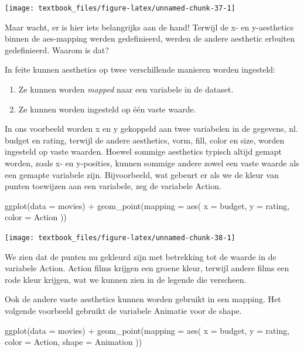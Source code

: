 \documentclass[]{tufte-book}
\newenvironment{Shaded}{}{}
\newcommand{\AttributeTok}[1]{\textcolor[rgb]{0.49,0.56,0.16}{#1}}
\newcommand{\FunctionTok}[1]{\textcolor[rgb]{0.02,0.16,0.49}{#1}}
\newcommand{\NormalTok}[1]{#1}
\newcommand{\SpecialCharTok}[1]{\textcolor[rgb]{0.25,0.44,0.63}{#1}}
\providecommand{\tightlist}{%
  \setlength{\itemsep}{0pt}\setlength{\parskip}{0pt}}
\begin{document}
\texttt{[image: textbook\_files/figure-latex/unnamed-chunk-37-1]}

Maar wacht, er is hier iets belangrijks aan de hand! Terwijl de x- en y-aesthetics binnen de aes-mapping werden gedefinieerd, werden de andere aesthetic erbuiten gedefinieerd. Waarom is dat?

In feite kunnen aesthetics op twee verschillende manieren worden ingesteld:

\begin{enumerate}
\def\labelenumi{\arabic{enumi}.}
\tightlist
\item
  Ze kunnen worden \emph{mapped} naar een variabele in de dataset.
\item
  Ze kunnen worden ingesteld op één vaste waarde.
\end{enumerate}

In ons voorbeeld worden x en y gekoppeld aan twee variabelen in de gegevens, nl. budget en rating, terwijl de andere aesthetics, vorm, fill, color en size, worden ingesteld op vaste waarden. Hoewel sommige aesthetics typisch altijd gemapt worden, zoals x- en y-posities, kunnen sommige andere zowel een vaste waarde als een gemapte variabele zijn. Bijvoorbeeld, wat gebeurt er als we de kleur van punten toewijzen aan een variabele, zeg de variabele Action.

\begin{Shaded}
\begin{Highlighting}[]
\FunctionTok{ggplot}\NormalTok{(}\AttributeTok{data =}\NormalTok{ movies) }\SpecialCharTok{+}
  \FunctionTok{geom\_point}\NormalTok{(}\AttributeTok{mapping =} \FunctionTok{aes}\NormalTok{(}
    \AttributeTok{x =}\NormalTok{ budget,}
    \AttributeTok{y =}\NormalTok{ rating,}
    \AttributeTok{color =}\NormalTok{ Action}
\NormalTok{  ))}
\end{Highlighting}
\end{Shaded}

\texttt{[image: textbook\_files/figure-latex/unnamed-chunk-38-1]}

We zien dat de punten nu gekleurd zijn met betrekking tot de waarde in de variabele Action. Action films krijgen een groene kleur, terwijl andere films een rode kleur krijgen, wat we kunnen zien in de legende die verscheen.

Ook de andere vaste aesthetics kunnen worden gebruikt in een mapping. Het volgende voorbeeld gebruikt de variabele Animatie voor de shape.

\begin{Shaded}
\begin{Highlighting}[]
\FunctionTok{ggplot}\NormalTok{(}\AttributeTok{data =}\NormalTok{ movies) }\SpecialCharTok{+}
  \FunctionTok{geom\_point}\NormalTok{(}\AttributeTok{mapping =} \FunctionTok{aes}\NormalTok{(}
    \AttributeTok{x =}\NormalTok{ budget,}
    \AttributeTok{y =}\NormalTok{ rating,}
    \AttributeTok{color =}\NormalTok{ Action,}
    \AttributeTok{shape =}\NormalTok{ Animation}
\NormalTok{  ))}
\end{Highlighting}
\end{Shaded}
\end{document}
